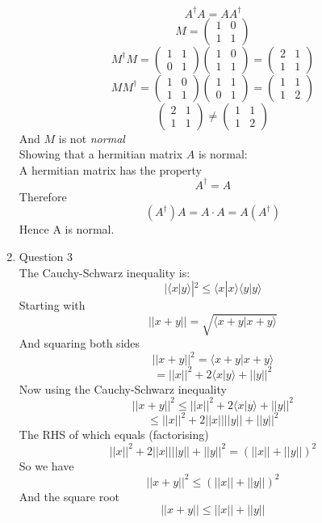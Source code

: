 \documentclass[12pt]{article}
\begin{document}
\begin{enumerate}
$$A^\dagger A = AA^\dagger$$
$$M = \left( \begin{array}{cc} 1 & 0 \\ 1 & 1 \end{array} \right) $$
$$ M^\dagger M = \left( \begin{array}{cc} 1 & 1 \\ 0 & 1 \end{array} \right) \left( \begin{array}{cc} 1 & 0 \\ 1 & 1 \end{array} \right) = \left( \begin{array}{cc} 2 & 1 \\ 1 & 1 \end{array} \right) $$
$$ MM^\dagger = \left( \begin{array}{cc} 1 & 0 \\ 1 & 1 \end{array} \right)\left( \begin{array}{cc} 1 & 1 \\ 0 & 1 \end{array} \right)= \left( \begin{array}{cc} 1 & 1 \\ 1 & 2 \end{array} \right) $$
$$ \left( \begin{array}{cc} 2 & 1 \\ 1 & 1 \end{array} \right) \neq \left( \begin{array}{cc} 1 & 1 \\ 1 & 2 \end{array} \right) $$
And $M$ is not {\em normal }
\\
Showing that a hermitian matrix $A$ is normal:
\\
A hermitian matrix has the property
$$ A^\dagger = A $$
Therefore
$$ (A^\dagger)A = A \cdot A = A(A^\dagger) $$
Hence A is normal. 

\item Question 3 \\
The Cauchy-Schwarz inequality is:
$$ |\langle x | y \rangle | ^ 2 \leq \langle x | x \rangle \langle y | y \rangle $$
Starting with 
$$||x+y||=\sqrt{\langle x+y | x+y\rangle}$$
And squaring both sides
$$ ||x+y||^2 = \langle x+y | x+y \rangle $$
$$ = ||x||^2 + 2\langle x|y \rangle + ||y||^2 $$
Now using the Cauchy-Schwarz inequality 
$$ ||x+y||^2 \leq ||x||^2 +2\langle x|y\rangle +||y||^2 $$
$$ \leq ||x||^2 +2||x||||y||+||y||^2 $$
The RHS of which equals (factorising)
$$ ||x||^2 +2||x||||y||+||y||^2  = (||x|| + ||y||)^2 $$
So we have 
$$ ||x+y||^2 \leq (||x||+||y||)^2 $$
And the square root
$$ ||x+y|| \leq ||x|| + ||y|| $$




\end{enumerate}
\end{document}
